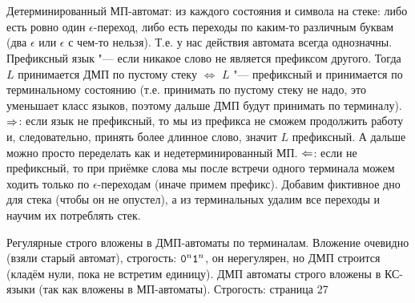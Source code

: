 \section{} %
	Детерминированный МП-автомат: из каждого состояния и символа на стеке: либо есть ровно один $\epsilon$-переход,
	либо есть переходы по каким-то различным буквам (два $\epsilon$ или $\epsilon$ с чем-то нельзя).
	Т.е. у нас действия автомата всегда однозначны.
	Префиксный язык "--- если никакое слово не является префиксом другого.
	Тогда $L$ принимается ДМП по пустому стеку $\iff$ $L$ "--- префиксный и принимается по терминальному состоянию
	(т.е. принимать по пустому стеку не надо, это уменьшает класс языков, поэтому дальше ДМП будут принимать по терминалу).
	$\Rightarrow$: если язык не префиксный, то мы из префикса не сможем продолжить работу и, следовательно, принять более длинное слово,
	значит $L$ префиксный.
	А дальше можно просто переделать как и недетерминированный МП.
	$\Leftarrow$: если не префиксный, то при приёмке слова мы после встречи одного терминала можем ходить только по $\epsilon$-переходам (иначе примем префикс).
	Добавим фиктивное дно для стека (чтобы он не опустел), а из терминальных удалим все переходы и научим их потреблять стек.

	Регулярные строго вложены в ДМП-автоматы по терминалам.
	Вложение очевидно (взяли старый автомат), строгость: $\t{0}^n\t{1}^n$, он нерегулярен, но ДМП строится (кладём нули, пока не встретим единицу).
	ДМП автоматы строго вложены в КС-языки (так как вложены в МП-автоматы).
	Строгость: \TODO страница 27
